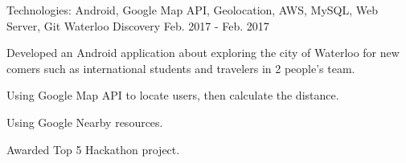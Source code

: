 \begin{cventries}
  \cventry
    {Technologies: \quad Android, Google Map API, Geolocation, AWS, MySQL, Web Server, Git}
    {Waterloo Discovery}
    {}
    {Feb. 2017 - Feb. 2017}
    {
      \begin{cvitems}
        \item {Developed an Android application about exploring the city of Waterloo for new comers such as international students and travelers in 2 people's team.}
        \item {Using Google Map API to locate users, then calculate the distance.}
        \item {Using Google Nearby resources.}
        \item {Awarded Top 5 Hackathon project.}
      \end{cvitems}
    }
    
    
    

\end{cventries}
